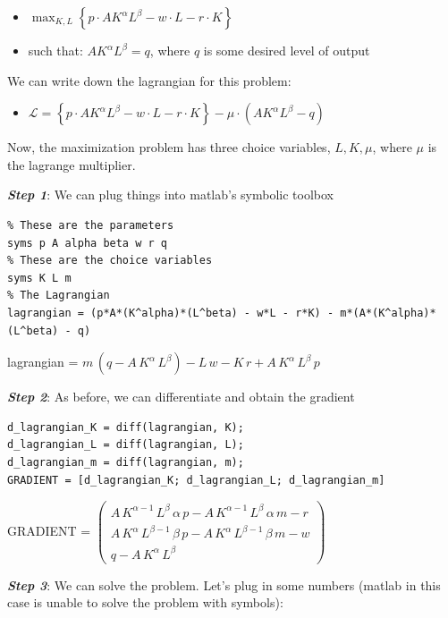 \documentclass[
]{book}
\providecommand{\tightlist}{%
  \setlength{\itemsep}{0pt}\setlength{\parskip}{0pt}}
\begin{document}
\begin{itemize}
\item
  \(\displaystyle \max_{K,L} \left\lbrace p\cdot AK^{\alpha } L^{\beta } -w\cdot L-r\cdot K\right\rbrace\)
\item
  such that: \(AK^{\alpha } L^{\beta } =q\), where \(q\) is some desired
  level of output
\end{itemize}

We can write down the lagrangian for this problem:

\begin{itemize}
\tightlist
\item
  \(\displaystyle \mathcal{L}=\left\lbrace p\cdot AK^{\alpha } L^{\beta } -w\cdot L-r\cdot K\right\rbrace -\mu \cdot (AK^{\alpha } L^{\beta } -q)\)
\end{itemize}

Now, the maximization problem has three choice variables, \(L,K,\mu\),
where \(\mu\) is the lagrange multiplier.

\textbf{\emph{Step 1}}: We can plug things into matlab's symbolic toolbox

\begin{verbatim}
% These are the parameters
syms p A alpha beta w r q
% These are the choice variables
syms K L m
% The Lagrangian
lagrangian = (p*A*(K^alpha)*(L^beta) - w*L - r*K) - m*(A*(K^alpha)*(L^beta) - q)
\end{verbatim}

lagrangian =
\(\displaystyle m\,{\left(q-A\,K^{\alpha } \,L^{\beta } \right)}-L\,w-K\,r+A\,K^{\alpha } \,L^{\beta } \,p\)

\textbf{\emph{Step 2}}: As before, we can differentiate and obtain the gradient

\begin{verbatim}
d_lagrangian_K = diff(lagrangian, K);
d_lagrangian_L = diff(lagrangian, L);
d_lagrangian_m = diff(lagrangian, m);  
GRADIENT = [d_lagrangian_K; d_lagrangian_L; d_lagrangian_m]
\end{verbatim}

GRADIENT = \(\displaystyle \left(\begin{array}{c} A\,K^{\alpha -1} \,L^{\beta } \,\alpha \,p-A\,K^{\alpha -1} \,L^{\beta } \,\alpha \,m-r\\ A\,K^{\alpha } \,L^{\beta -1} \,\beta \,p-A\,K^{\alpha } \,L^{\beta -1} \,\beta \,m-w\\ q-A\,K^{\alpha } \,L^{\beta } \end{array}\right)\)

\textbf{\emph{Step 3}}: We can solve the problem. Let's plug in some numbers
(matlab in this case is unable to solve the problem with symbols):
\end{document}
